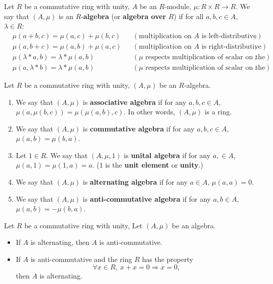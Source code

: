\begin{definition}
  Let
    $R$ be a commutative ring with unity,
    $A$ be an $R$-module,
    $\mu \colon R \times R \to R$.
  We say that $(A, \mu)$ is an $R$-\textbf{algebra}
  (or \textbf{algebra over} $R$) if
  for all $a, b, c \in A$, $\lambda \in R$:
  \begin{subequations}
    \begin{alignat}{2}
      & \mu(a + b, c) = \mu(a, c) + \mu(b, c)
      && (\text{multiplication on $A$ is left-distributive}), \\
      & \mu(a, b + c) = \mu(a, b) + \mu(a, c)
      && (\text{multiplication on $A$ is right-distributive}), \\
      & \mu(\lambda * a, b) = \lambda * \mu(a, b)\qquad
      && (\text{$\mu$ respects multiplication of scalar on the left}), \\
      & \mu(a, \lambda * b) = \lambda * \mu(a, b)\qquad
      && (\text{$\mu$ respects multiplication of scalar on the right}).
    \end{alignat}
  \end{subequations}
\end{definition}
\begin{definition}
  Let $R$ be a commutative ring with unity, $(A, \mu)$ be an $R$-algebra.
  \begin{enumerate}
    \item
      We say that $(A, \mu)$ is \textbf{associative algebra} if
      for any $a, b, c \in A$, $\mu(a, \mu(b, c)) = \mu(\mu(a, b), c)$.
      In other words, $(A, \mu)$ is a ring.
    \item
      We say that $(A, \mu)$ is \textbf{commutative algebra} if
      for any $a, b, c \in A$, $\mu(a, b) = \mu(b, a)$.
    \item
      Let $1 \in R$.
      We say that $(A, \mu, 1)$ is \textbf{unital algebra} if
      for any $a, \in A$, $\mu(a, 1) = \mu(1, a) = a$.
      ($1$ is the \textbf{unit element} or \textbf{unity}.)
    \item
      We say that $(A, \mu)$ is \textbf{alternating algebra} if
      for any $a \in A$, $\mu(a, a) = 0$.
    \item
      We say that $(A, \mu)$ is \textbf{anti-commutative algebra} if
      for any $a, b \in A$, $\mu(a, b) = - \mu(b, a)$.
  \end{enumerate}
\end{definition}
\begin{proposition}
  Let $R$ be a commutative ring with unity,
  Let $(A, \mu)$ be an algebra.
  \begin{itemize}
    \item
      If $A$ is alternating, then $A$ is anti-commutative.
    \item
      If $A$ is anti-commutative and the ring $R$ has the property
      \begin{equation}
        \label{equation:ring/characteristics_is_not_divisible_by_2}
        \forall x \in R,\ x + x = 0 \Rightarrow x = 0,
      \end{equation}
      then $A$ is alternating.
  \end{itemize}
\end{proposition}
